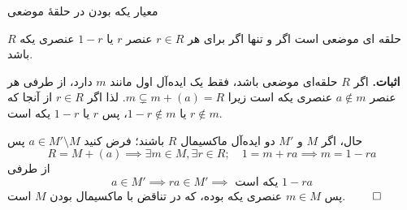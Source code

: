 \begin{frame}[t]{معیار یکه بودن در حلقهٔ موضعی}
    \begin{theorem}
        \(R\)
        حلقه ای موضعی است اگر و تنها اگر برای هر
        \(r\in R\)
        عنصر
        \(r\)
        یا
        \(1-r\)
        عنصری یکه باشد.
    \end{theorem}

    \textbf{اثبات.}
    اگر
    \(R\)
    حلقه‌ای
    موضعی باشد،‌ فقط یک ایده‌آل اول مانند
    \(m\)
    دارد، از طرفی هر عنصر
    \(a \notin m\)
    عنصری یکه است زیرا
    \(m \subsetneq m + (a) = R\).
    لذا اگر
    \(r \in R\)
    از آنجا که
    \(r \notin m\)
    یا
    \(1-r \notin m\)، پس
    \(r \)
    یا
    \(1-r \)
    یکه است.

    حال، اگر
    \(M\)
    و
    \(M'\)
    دو ایده‌آل ماکسیمال
    \(R\)
    باشند؛ فرض کنید
    \(a \in M' \setminus M\)
    پس
    \[
        R = M + (a) \implies \exists m \in M, \exists r \in R; \quad 1 = m + ra \implies m = 1 - ra
    \]
    از طرفی
    \[
        a \in M' \implies ra \in M' \implies \text{ یکه است } 1 - ra
    \]
    پس
    \(m \in M\)
    عنصری یکه بوده، که در تناقض با ماکسیمال بودن
    \(M\)
    است.
\hfill \(\qed\)
\end{frame}

